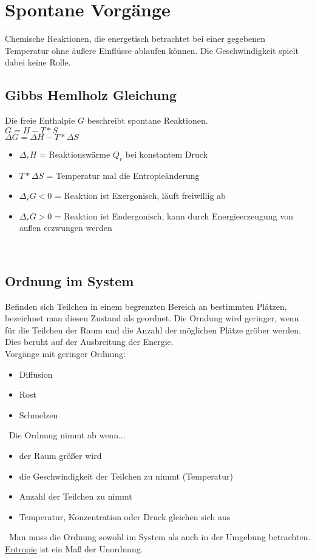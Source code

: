 \section{Spontane Vorgänge} \label{sec:spontane_voränge}
Chemische Reaktionen, die energetisch betrachtet bei einer gegebenen Temperatur ohne äußere Einflüsse ablaufen können.
Die Geschwindigkeit spielt dabei keine Rolle.

\subsection{Gibbs Hemlholz Gleichung}
Die freie Enthalpie $G$ beschreibt spontane Reaktionen. \\
$G = H - T * S$ \\
$\Delta G = \Delta H - T * \Delta S$ \\
\begin{itemize}
    \item $\Delta _rH$ = Reaktionswärme $Q_r$ bei konstantem Druck
    \item $T * \Delta S$ = Temperatur mal die Entropieänderung
    \item $\Delta_rG < 0$ = Reaktion ist Exergonisch, läuft freiwillig ab
    \item $\Delta_rG > 0$ = Reaktion ist Endergonisch, kann durch Energieerzeugung von außen erzwungen werden
\end{itemize}
\

\subsection{Ordnung im System}
Befinden sich Teilchen in einem begrenzten Bereich an bestimmten Plätzen,
bezeichnet man diesen Zustand als geordnet.
Die Orndung wird geringer,
wenn für die Teilchen der Raum und die Anzahl der möglichen Plätze gröber werden.
Dies beruht auf der Ausbreitung der Energie. \\
Vorgänge mit geringer Ordnung: \\
\begin{itemize}
    \item Diffusion
    \item Rost
    \item Schmelzen
\end{itemize}
\
Die Ordnung nimmt ab wenn...
\begin{itemize}
    \item der Raum größer wird
    \item die Geschwindigkeit der Teilchen zu nimmt (Temperatur)
    \item Anzahl der Teilchen zu nimmt
    \item Temperatur, Konzentration oder Druck gleichen sich aus
\end{itemize}
\
Man muss die Ordnung sowohl im System als auch in der Umgebung betrachten. 
\hyperref[sec:entropie]{Entropie} ist ein Maß der Unordnung.
